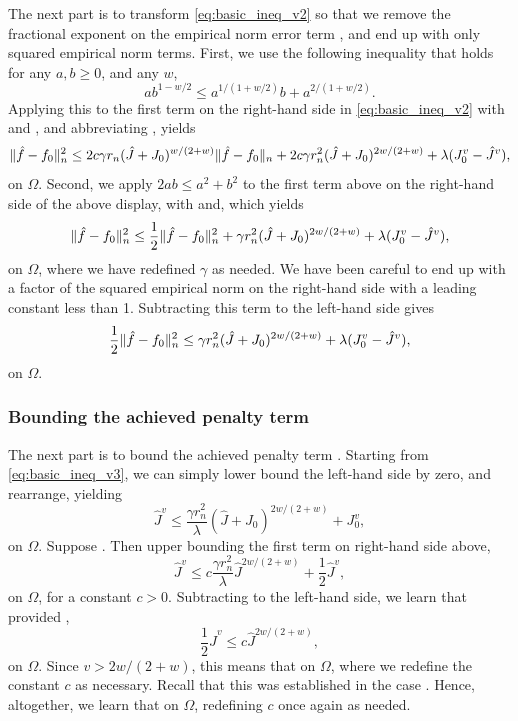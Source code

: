 \documentclass{article}
\begin{document}
The next part is to transform \eqref{eq:basic_ineq_v2} so that we remove the
fractional exponent on the empirical norm error term ,
and end up with only squared empirical norm terms. First, we use the following
inequality that holds for any $a,b \geq 0$, and any $w$,    
\[
a b^{1-w/2} \leq a^{1/(1+w/2)} b + a^{2/(1+w/2)}.
\]
Applying this to the first term on the right-hand side in
\eqref{eq:basic_ineq_v2} with 
and , and abbreviating ,
yields 
\[
\|\hat{f} - f_0\|_n^2 \leq 2c \gamma r_n ({\hat J} + J_0)^{w/(2+w)} \|\hat{f}-f_0\|_n +
2c \gamma r_n^2 ({\hat J} + J_0)^{2w/(2+w)} + \lambda (J_0^v - {\hat J}^v), 
\]
on $\Omega$. Second, we apply $2ab \leq a^2+b^2$ to the first term above on the
right-hand side of the above display, with  and, which 
yields       
\[
\|\hat{f} - f_0\|_n^2 \leq \frac{1}{2}\|\hat{f} - f_0\|_n^2 + \gamma r_n^2 ({\hat J} +
J_0)^{2w/(2+w)} + \lambda (J_0^v - {\hat J}^v),   
\]
on $\Omega$, where we have redefined $\gamma$ as needed. We have been careful to
end up with a factor of the squared empirical norm on the right-hand side with a
leading constant less than 1. Subtracting this term  to the left-hand side gives
\begin{equation}
\label{eq:basic_ineq_v3}
\frac{1}{2} \|\hat{f} - f_0\|_n^2 \leq \gamma r_n^2 ({\hat J} + J_0)^{2w/(2+w)} +
\lambda (J_0^v - {\hat J}^v),   
\end{equation}
on $\Omega$.

\subsubsection{Bounding the achieved penalty term}

The next part is to bound the achieved penalty term . Starting
from \eqref{eq:basic_ineq_v3}, we can simply lower bound the left-hand side by
zero, and rearrange, yielding 
\[
{\hat J}^v \leq \frac{\gamma r_n^2}{\lambda} ({\hat J} + J_0)^{2w/(2+w)} +
J_0^v, 
\]
on $\Omega$. Suppose . Then upper bounding the first term
on right-hand side above,
\[
{\hat J}^v \leq c \frac{\gamma r_n^2}{\lambda} {\hat J}^{2w/(2+w)} +
\frac{1}{2}{\hat J}^v, 
\]
on $\Omega$, for a constant $c>0$. Subtracting 
to the left-hand side, we learn that provided ,  
\[
\frac{1}{2}{\hat J}^v \leq c {\hat J}^{2w/(2+w)},
\]
on $\Omega$. Since $v > 2w/(2+w)$, this means that  on
$\Omega$, where we redefine the constant $c$ as necessary. Recall that this was
established in the case .  Hence, altogether, we learn
that  on $\Omega$, redefining $c$ once
again as needed.     
\end{document}
